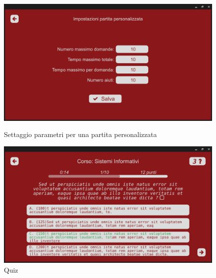         \begin{figure}[H]
          \centering
          \begin{minipage}[b]{0.48\textwidth}
            \includegraphics[width=\textwidth]{Images/mockup/custom.png}
            \caption{Settaggio parametri per una partita personalizzata}
            \label{fig:custom}
          \end{minipage}
          \hfill
          \begin{minipage}[b]{0.48\textwidth}
            \includegraphics[width=\textwidth]{Images/mockup/quiz3.png}
            \caption{Quiz}
            \label{fig:quiz3}
          \end{minipage}
        \end{figure}

